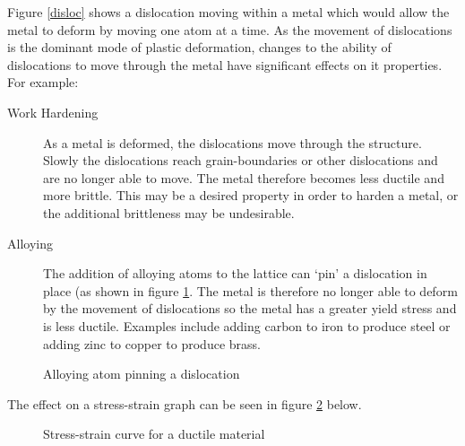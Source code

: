 Figure \ref{disloc} shows a dislocation moving within a metal which would allow the metal to deform by moving one atom at a time. As the movement of dislocations is the dominant mode of plastic deformation, changes to the ability of dislocations to move through the metal have significant effects on it properties. For example:
\begin{description}
    \item[Work Hardening] As a metal is deformed, the dislocations move through the structure. Slowly the dislocations reach grain-boundaries or other dislocations and are no longer able to move. The metal therefore becomes less ductile and more brittle. This may be a desired property in order to harden a metal, or the additional brittleness may be undesirable.
    \item[Alloying] The addition of alloying atoms to the lattice can `pin' a dislocation in place (as shown in figure \ref{alloying}. The metal is therefore no longer able to deform by the movement of dislocations so the metal has a greater yield stress and is less ductile. Examples include adding carbon to iron to produce steel or adding zinc to copper to produce brass.
\end{description}
\begin{figure}[h]\begin{center}
    \caption{Alloying atom pinning a dislocation}\label{alloying}
\end{center}\end{figure}

The effect on a stress-strain graph can be seen in figure \ref{stress-strain-alloy} below.

\begin{figure}[ht]
    \begin{center}
    \end{center}
    \caption{Stress-strain curve for a ductile material}
    \label{stress-strain-alloy}
\end{figure}

